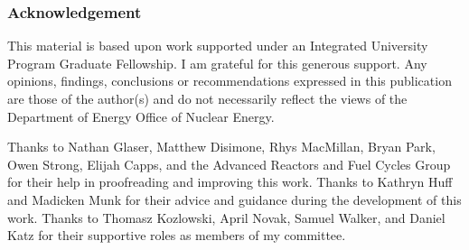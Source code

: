 \begin{frame}
  \frametitle{Acknowledgement}
This material is based upon work supported under an Integrated University Program Graduate Fellowship. I am grateful for this generous support. Any opinions, findings, conclusions or recommendations expressed in this publication are those of the author(s) and do not necessarily reflect the views of the Department of Energy Office of Nuclear Energy.

Thanks to Nathan Glaser, Matthew Disimone, Rhys MacMillan, Bryan Park, Owen Strong, Elijah Capps, and the Advanced Reactors and Fuel Cycles Group for their help in proofreading and improving this work.
Thanks to Kathryn Huff and Madicken Munk for their advice and guidance during the development of this work.
Thanks to Thomasz Kozlowski, April Novak, Samuel Walker, and Daniel Katz for their supportive roles as members of my committee.
\end{frame}
